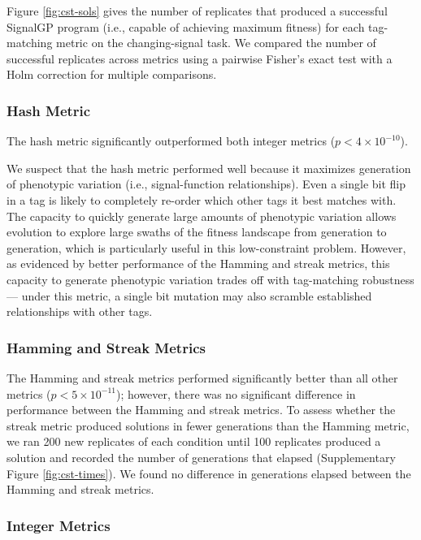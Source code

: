 % 

Figure \ref{fig:cst-sols} gives the number of replicates that produced a successful SignalGP program (i.e., capable of achieving maximum fitness) for each tag-matching metric on the changing-signal task.
We compared the number of successful replicates across metrics using a pairwise Fisher's exact test with a Holm correction for multiple comparisons.

\subsubsection{Hash Metric}

The hash metric significantly outperformed both integer metrics ($p < 4\times10^{-10}$).

We suspect that the hash metric performed well because it maximizes generation of phenotypic variation (i.e., signal-function relationships).
Even a single bit flip in a tag is likely to completely re-order which other tags it best matches with.
The capacity to quickly generate large amounts of phenotypic variation allows evolution to explore large swaths of the fitness landscape from generation to generation, which is particularly useful in this low-constraint problem.
However, as evidenced by better performance of the Hamming and streak metrics, this capacity to generate phenotypic variation trades off with tag-matching robustness --- under this metric, a single bit mutation may also scramble established relationships with other tags.

\subsubsection{Hamming and Streak Metrics}

The Hamming and streak metrics performed significantly better than all other metrics ($p < 5\times10^{-11}$); however, there was no significant difference in performance between the Hamming and streak metrics.
To assess whether the streak metric produced solutions in fewer generations than the Hamming metric, we ran 200 new replicates of each condition until 100 replicates produced a solution and recorded the number of generations that elapsed (Supplementary Figure \ref{fig:cst-times}).
We found no difference in generations elapsed between the Hamming and streak metrics.

\subsubsection{Integer Metrics}

